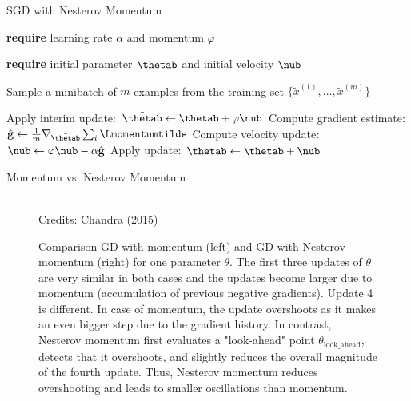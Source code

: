 \begin{vbframe}{SGD with Nesterov Momentum}
  \begin{algorithm}[H]
  \small
    \caption{Stochastic gradient descent with Nesterov momentum}
    \begin{algorithmic}[1]
    \State \textbf{require} learning rate $\alpha$ and momentum $\varphi$ \strut
    \State \textbf{require} initial parameter $\thetab$ and initial velocity $\nub$ \strut
        \State \parbox[t]{\dimexpr\linewidth-\algorithmicindent}{Sample a minibatch of $m$ examples from the training set $\{\tilde{x}^{(1)},\dots,\tilde{x}^{(m)}\}$}
        \State Apply interim update: $\tilde{\thetab} \leftarrow \thetab + \varphi \nub$
        \State Compute gradient estimate: $\hat{\mathbf{g}} \leftarrow  \frac{1}{m} \nabla_{\tilde{\thetab}} \sum_{i} \Lmomentumtilde$
        \State Compute velocity update: $\nub \leftarrow \varphi \nub - \alpha \hat{\mathbf{g}}$
        \State Apply update: $\thetab \leftarrow \thetab + \nub$
      \EndWhile
    \end{algorithmic}
  \end{algorithm}
\end{vbframe}


\begin{vbframe}{Momentum vs. Nesterov Momentum}
  \begin{figure}
   \vspace{-0.3cm}
  \captionsetup{font=footnotesize,labelfont=footnotesize, labelfont = bf}
    \centering
      \tiny{\\Credits: Chandra (2015)}
      \caption{\footnotesize{Comparison GD with momentum (left) and GD with Nesterov momentum (right) for one parameter $\theta$. The first three updates of $\theta$ are very similar in both cases and the updates become larger due to momentum (accumulation of previous negative gradients). Update 4 is different. In case of momentum, the update overshoots as it makes an even bigger step due to the gradient history. In contrast, Nesterov momentum first evaluates a "look-ahead" point $\theta_{\text{look\_ahead}}$, detects that it overshoots, and slightly reduces the overall magnitude of the fourth update. Thus, Nesterov momentum reduces overshooting and leads to smaller oscillations than momentum. }}
    \end{figure}
\end{vbframe}

